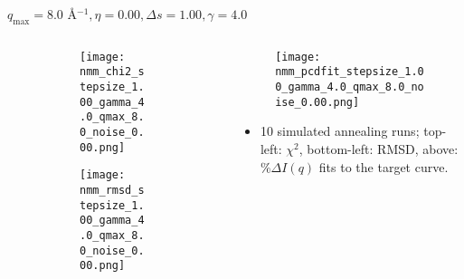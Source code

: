 \documentclass{beamer}
\begin{document}
\begin{frame}{$ q_{\textrm{max}}=8.0 $ \AA $^{-1}, \eta=0.00, \Delta s=1.00, \gamma=4.0$}
	\begin{columns}
		\begin{column}{.5\textwidth}
			\begin{figure}[H]
			\centering
			\begin{subfigure}[b]{\textwidth}
				\centering
				\texttt{[image: nmm\_chi2\_stepsize\_1.00\_gamma\_4.0\_qmax\_8.0\_noise\_0.00.png]}
				\label{fig:}
			\end{subfigure}
			\begin{subfigure}[b]{\textwidth}
				\centering
				\texttt{[image: nmm\_rmsd\_stepsize\_1.00\_gamma\_4.0\_qmax\_8.0\_noise\_0.00.png]}
				\label{fig:}
			\end{subfigure}
			\end{figure}
		\end{column}
		\begin{column}{.5\textwidth}
			\begin{figure}[H]
				\centering
				\texttt{[image: nmm\_pcdfit\_stepsize\_1.00\_gamma\_4.0\_qmax\_8.0\_noise\_0.00.png]}
				\label{fig:}
			\end{figure}
			\begin{itemize}
				\item 10 simulated annealing runs; top-left: $\chi^2$, bottom-left: RMSD, above: $\%\Delta I(q)$ fits to the target curve.
			\end{itemize}
		\end{column}
	\end{columns}
\end{frame}
 
\end{document}
